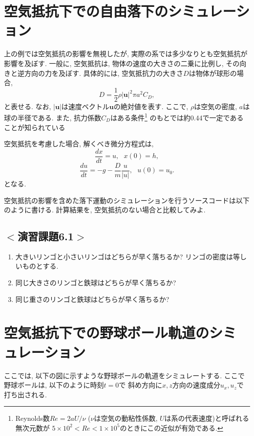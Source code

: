 \newpage


\section{空気抵抗下での自由落下のシミュレーション}
上の例では空気抵抗の影響を無視したが, 実際の系では多少なりとも空気抵抗が影響を及ぼす. 
一般に, 空気抵抗は, 物体の速度の大きさの二乗に比例し, その向きと逆方向の力を及ぼす. 
具体的には, 空気抵抗力の大きさ$D$は物体が球形の場合, 
\begin{equation}
D=\frac{1}{2}\rho |\mathbf{u}|^2 \pi a^2 C_D,
\end{equation}
と表せる. 
なお, $|\mathbf{u}|$は速度ベクトル$\mathbf{u}$の絶対値を表す. 
ここで, $\rho$は空気の密度, $a$は球の半径である.
また, 抗力係数$C_D$はある条件\footnote{
Reynolds数$Re=2aU/\nu$ ($\nu$は空気の動粘性係数, $U$は系の代表速度)と呼ばれる無次元数が
$5 \times 10^2 < Re < 1 \times 10^5$のときにこの近似が有効である. 
}
のもとでは約0.44で一定であることが知られている

空気抵抗を考慮した場合, 解くべき微分方程式は, 
\begin{equation}
\frac{dx}{dt}=u, \ \ \ x(0)=h,
\end{equation}
\begin{equation}
\frac{du}{dt}=-g-\frac{D}{m}\frac{u}{|u|}, \ \ \ u(0)=u_0.
\end{equation}
となる. 

空気抵抗の影響を含めた落下運動のシミュレーションを行うソースコードは以下のように書ける. 
計算結果を, 空気抵抗のない場合と比較してみよ. 


\subsection*{$<$演習課題6.1$>$}
\begin{enumerate}
\item 大きいリンゴと小さいリンゴはどちらが早く落ちるか? リンゴの密度は等しいものとする. 
\item 同じ大きさのリンゴと鉄球はどちらが早く落ちるか?
\item 同じ重さのリンゴと鉄球はどちらが早く落ちるか?
\end{enumerate}

\section{空気抵抗下での野球ボール軌道のシミュレーション}
ここでは, 以下の図に示すような野球ボールの軌道をシミュレートする. 
ここで野球ボールは, 以下のように時刻$t=0$で%
斜め方向に$x, z$方向の速度成分$u_x, u_z$で打ち出される. 

